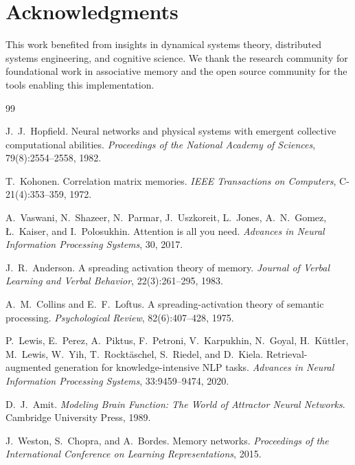 \documentclass[11pt]{article}
\begin{document}
\section*{Acknowledgments}
This work benefited from insights in dynamical systems theory,
distributed systems engineering, and cognitive science. We thank the
research community for foundational work in associative memory and the
open source community for the tools enabling this implementation.


\begin{thebibliography}{99}

J.~J.~Hopfield.
Neural networks and physical systems with emergent collective computational abilities.
\textit{Proceedings of the National Academy of Sciences}, 79(8):2554--2558, 1982.

T.~Kohonen.
Correlation matrix memories.
\textit{IEEE Transactions on Computers}, C-21(4):353--359, 1972.

A.~Vaswani, N.~Shazeer, N.~Parmar, J.~Uszkoreit, L.~Jones, A.~N.~Gomez, {\L}.~Kaiser, and I.~Polosukhin.
Attention is all you need.
\textit{Advances in Neural Information Processing Systems}, 30, 2017.

J.~R.~Anderson.
A spreading activation theory of memory.
\textit{Journal of Verbal Learning and Verbal Behavior}, 22(3):261--295, 1983.

A.~M.~Collins and E.~F.~Loftus.
A spreading-activation theory of semantic processing.
\textit{Psychological Review}, 82(6):407--428, 1975.

P.~Lewis, E.~Perez, A.~Piktus, F.~Petroni, V.~Karpukhin, N.~Goyal, H.~K{\"u}ttler, M.~Lewis, W.~Yih, T.~Rockt{\"a}schel, S.~Riedel, and D.~Kiela.
Retrieval-augmented generation for knowledge-intensive NLP tasks.
\textit{Advances in Neural Information Processing Systems}, 33:9459--9474, 2020.

D.~J.~Amit.
\textit{Modeling Brain Function: The World of Attractor Neural Networks}.
Cambridge University Press, 1989.

J.~Weston, S.~Chopra, and A.~Bordes.
Memory networks.
\textit{Proceedings of the International Conference on Learning Representations}, 2015.


\end{thebibliography}
\end{document}
